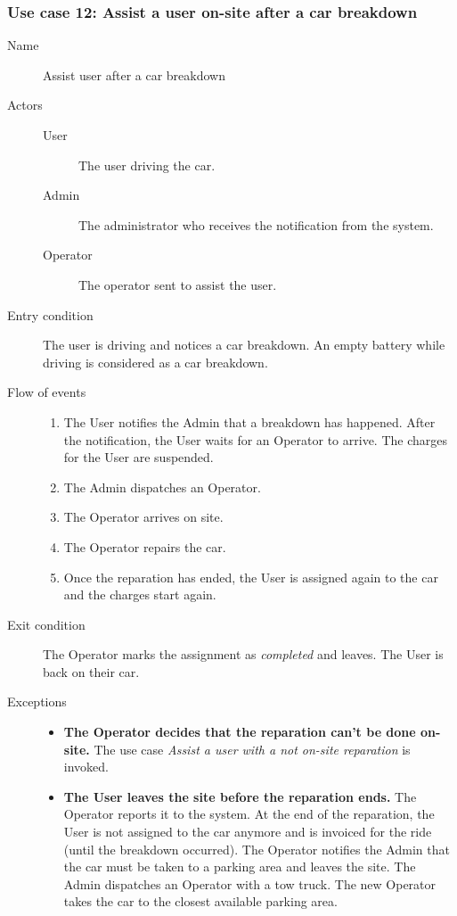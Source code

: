 	\subsubsection{Use case 12: Assist a user on-site after a car breakdown}
		\begin{description}
			\item[Name] Assist user after a car breakdown
			\item[Actors] \hfill
			\begin{description}
				\item[User] The user driving the car.
				\item[Admin] The administrator who receives the notification from the system.
				\item[Operator] The operator sent to assist the user.
			\end{description}
			\item[Entry condition] The user is driving and notices a car breakdown. An empty battery while driving is considered as a car breakdown.
			\item[Flow of events] \hfill
			\begin{enumerate}
				\item The User notifies the Admin that a breakdown has happened. After the notification, the User waits for an Operator to arrive. The charges for the User are suspended.
				\item The Admin dispatches an Operator.
				\item The Operator arrives on site.
				\item The Operator repairs the car.
				\item Once the reparation has ended, the User is assigned again to the car and the charges start again.
			\end{enumerate}
			\item[Exit condition] The Operator marks the assignment as \textit{completed} and leaves. The User is back on their car.
			\item[Exceptions] \hfill
			\begin{itemize}
				\item \textbf{The Operator decides that the reparation can't be done on-site.} The use case \textit{Assist a user with a not on-site reparation} is invoked.
				\item \textbf{The User leaves the site before the reparation ends.} The Operator reports it to the system. At the end of the reparation, the User is not assigned to the car anymore and is invoiced for the ride (until the breakdown occurred). The Operator notifies the Admin that the car must be taken to a parking area and leaves the site. The Admin dispatches an Operator with a tow truck. The new Operator takes the car to the closest available parking area.

\end{itemize}
\end{description}
